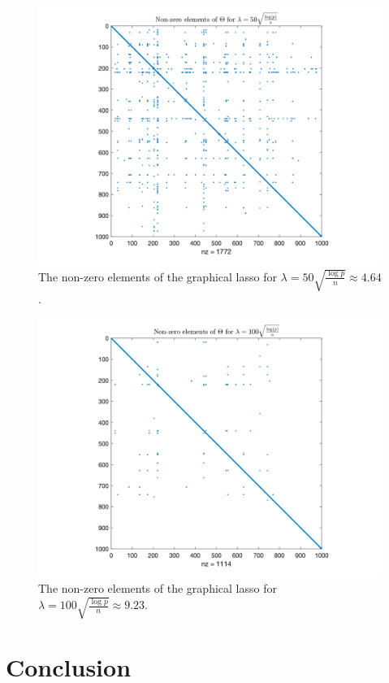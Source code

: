 \documentclass[10pt, letterpaper]{article}
\begin{document}
\begin{figure}
\centering
\includegraphics[width=\textwidth]{plots/gene50.png}
\caption{The non-zero elements of the graphical lasso for $\lambda = 50\sqrt{\frac{\log p}{n}} \approx 4.64$.}
\label{fig:gene50}
\end{figure}


\begin{figure}
\centering
\includegraphics[width=\textwidth]{plots/gene100.png}
\caption{The non-zero elements of the graphical lasso for $\lambda = 100\sqrt{\frac{\log p}{n}} \approx 9.23$.}
\label{fig:gene100}
\end{figure}



\section{Conclusion}
\end{document}
